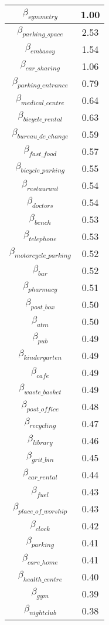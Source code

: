 \begin{tabular}{c|c}
$\beta_{symmetry}$ & 1.00 \\
\hline
$\beta_{parking\_space}$ & 2.53 \\
$\beta_{embassy}$ & 1.54 \\
$\beta_{car\_sharing}$ & 1.06 \\
$\beta_{parking\_entrance}$ & 0.79 \\
$\beta_{medical\_centre}$ & 0.64 \\
$\beta_{bicycle\_rental}$ & 0.63 \\
$\beta_{bureau\_de\_change}$ & 0.59 \\
$\beta_{fast\_food}$ & 0.57 \\
$\beta_{bicycle\_parking}$ & 0.55 \\
$\beta_{restaurant}$ & 0.54 \\
$\beta_{doctors}$ & 0.54 \\
$\beta_{bench}$ & 0.53 \\
$\beta_{telephone}$ & 0.53 \\
$\beta_{motorcycle\_parking}$ & 0.52 \\
$\beta_{bar}$ & 0.52 \\
$\beta_{pharmacy}$ & 0.51 \\
$\beta_{post\_box}$ & 0.50 \\
$\beta_{atm}$ & 0.50 \\
$\beta_{pub}$ & 0.49 \\
$\beta_{kindergarten}$ & 0.49 \\
$\beta_{cafe}$ & 0.49 \\
$\beta_{waste\_basket}$ & 0.49 \\
$\beta_{post\_office}$ & 0.48 \\
$\beta_{recycling}$ & 0.47 \\
$\beta_{library}$ & 0.46 \\
$\beta_{grit\_bin}$ & 0.45 \\
$\beta_{car\_rental}$ & 0.44 \\
$\beta_{fuel}$ & 0.43 \\
$\beta_{place\_of\_worship}$ & 0.43 \\
$\beta_{clock}$ & 0.42 \\
$\beta_{parking}$ & 0.41 \\
$\beta_{care\_home}$ & 0.41 \\
$\beta_{health\_centre}$ & 0.40 \\
$\beta_{gym}$ & 0.39 \\
$\beta_{nightclub}$ & 0.38 \\

\end{tabular}
